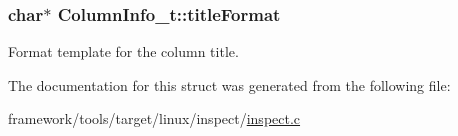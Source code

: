 \subsubsection[{\texorpdfstring{title\+Format}{titleFormat}}]{\setlength{\rightskip}{0pt plus 5cm}char$\ast$ Column\+Info\+\_\+t\+::title\+Format}\hypertarget{struct_column_info__t_a237f462c160dab71285059206384d2c1}{}\label{struct_column_info__t_a237f462c160dab71285059206384d2c1}


Format template for the column title. 



The documentation for this struct was generated from the following file\+:\begin{DoxyCompactItemize}
\item 
framework/tools/target/linux/inspect/\hyperlink{inspect_8c}{inspect.\+c}\end{DoxyCompactItemize}
